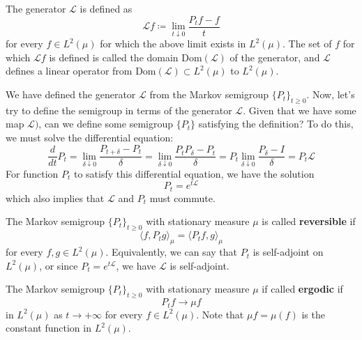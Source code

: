 \documentclass{article}
\begin{document}
\begin{definition}[Generator]
The generator $\mathscr{L}$ is defined as 
\[\mathscr{L} f \coloneqq \lim_{t \downarrow 0} \frac{P_t f - f}{t}\]
for every $f \in L^2 (\mu)$ for which the above limit exists in $L^2 (\mu)$. The set of $f$ for which $\mathscr{L}f$ is defined is called the domain $\mathrm{Dom}(\mathscr{L})$ of the generator, and $\mathscr{L}$ defines a linear operator from $\mathrm{Dom}(\mathscr{L}) \subset L^2 (\mu)$ to $L^2 (\mu)$. 
\end{definition}

We have defined the generator $\mathscr{L}$ from the Markov semigroup $\{P_t\}_{t \geq 0}$. Now, let's try to define the semigroup in terms of the generator $\mathscr{L}$. Given that we have some map $\mathscr{L})$, can we define some semigroup $\{P_t\}$ satisfying the definition? To do this, we must solve the differential equation: 
\[\frac{d}{dt} P_t = \lim_{\delta \downarrow 0} \frac{P_{t + \delta} - P_t}{\delta} = \lim_{\delta \downarrow 0} \frac{P_t P_\delta - P_t}{\delta} = P_t \lim_{\delta \downarrow 0} \frac{P_\delta - I}{\delta} = P_t \mathscr{L}\]
For function $P_t$ to satisfy this differential equation, we have the solution 
\[P_t = e^{t \mathscr{L}}\]
which also implies that $\mathscr{L}$ and $P_t$ must commute. 

\begin{definition}[Reversibility]
The Markov semigroup $\{P_t\}_{t \geq 0}$ with stationary measure $\mu$ is called \textbf{reversible} if 
\[\langle f, P_t g \rangle_\mu = \langle P_t f, g \rangle_\mu\]
for every $f, g \in L^2 (\mu)$. Equivalently, we can say that $P_t$ is self-adjoint on $L^2 (\mu)$, or since $P_t = e^{t \mathscr{L}}$, we have $\mathscr{L}$ is self-adjoint. 
\end{definition}

\begin{definition}[Ergodicity]
The Markov semigroup $\{P_t\}_{t \geq 0}$ with stationary measure $\mu$ if called \textbf{ergodic} if 
\[P_t f \rightarrow \mu f\]
in $L^2 (\mu)$ as $t \rightarrow +\infty$ for every $f \in L^2 (\mu)$. Note that $\mu f = \mu(f)$ is the constant function in $L^2 (\mu)$. 
\end{definition}
\end{document}
